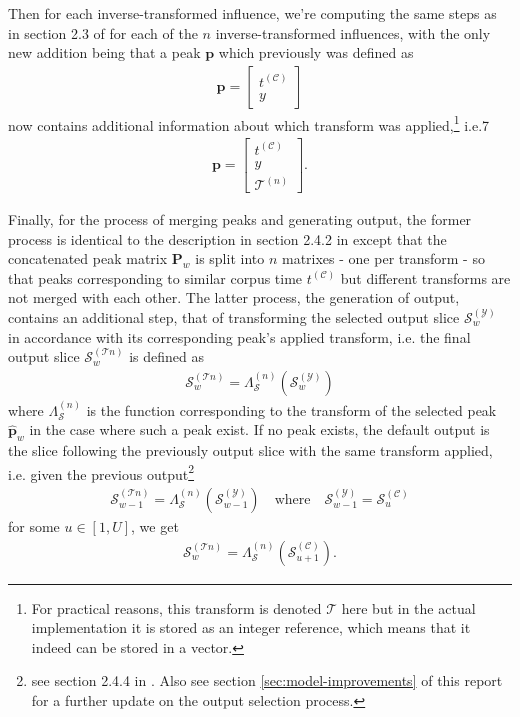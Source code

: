 \noindent Then for each inverse-transformed influence, we're computing the same steps as in section 2.3 of \cite{borg2020dynamic} for each of the $n$ inverse-transformed influences, with the only new addition being that a peak $\bm p$ which previously was defined as \begin{align}
		\bm p = \begin{bmatrix}
			t^{(\mathcal C)} \\ y
		\end{bmatrix}
	\end{align}
	now contains additional information about which transform was applied,\footnote{For practical reasons, this transform is denoted $\mathcal T$ here but in the actual implementation it is stored as an integer reference, which means that it indeed can be stored in a vector.} i.e.7
	\begin{align}\label{eq:peak-transform}
		\bm p = \begin{bmatrix}
 			t^{(\mathcal C)} \\ y \\ \mathcal T^{(n)}		
	    \end{bmatrix}.
	\end{align}

Finally, for the process of merging peaks and generating output, the former process is identical to the description in section 2.4.2 in \cite{borg2020dynamic} except that the concatenated peak matrix $\bm P_w$ is split into $n$ matrixes -  one per transform - so that peaks corresponding to similar corpus time $t^{(\mathcal C)}$ but different transforms are not merged with each other. The latter process, the generation of output, contains an additional step, that of transforming the selected output slice $\mathcal S^{(\mathcal Y)}_w$ in accordance with its corresponding peak's applied transform, i.e. the final output slice $\mathcal S^{(\mathcal Tn)}_w$ is defined as
	\begin{align}
		\mathcal S^{(\mathcal Tn)}_w = \Lambda^{(n)}_{\mathcal S}\left(\mathcal S^{(\mathcal Y)}_w\right)
	\end{align}
	where $\Lambda^{(n)}_{\mathcal S}$ is the function corresponding to the transform of the selected peak $\bm {\hat p}_w$ in the case where such a peak exist. If no peak exists, the default output is the slice following the previously output slice with the same transform applied, i.e. given the previous output\footnote{see section 2.4.4 in \cite{borg2020dynamic}. Also see section \ref{sec:model-improvements} of this report for a further update on the output selection process.}
		\begin{align}
					\mathcal S^{(\mathcal Tn)}_{w-1} = \Lambda^{(n)}_{\mathcal S}\left(\mathcal S^{(\mathcal Y)}_{w-1}\right)			\quad \text{where} \quad \mathcal S^{(\mathcal Y)}_{w-1} = \mathcal S^{(\mathcal C)}_u
		\end{align}
		for some $u \in [1, U]$, we get
		\begin{align}
			\mathcal S^{(\mathcal Tn)}_w = \Lambda^{(n)}_\mathcal S \left(\mathcal S^{(\mathcal C)}_{u+1}\right).
		\end{align}
		
